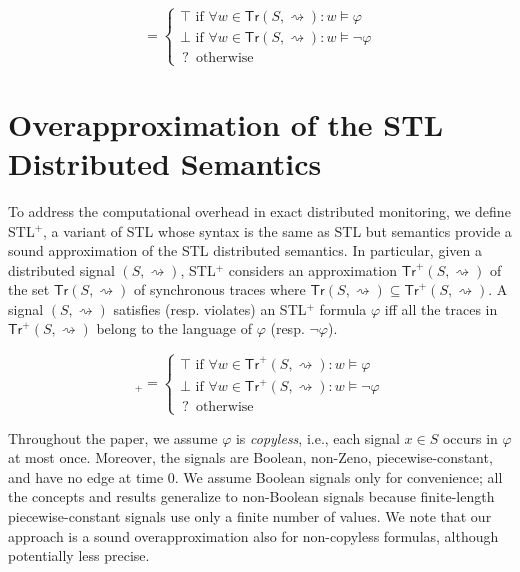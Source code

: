 \documentclass[iicol,lineno]{sn-jnl}
\newcommand{\hb}{\rightsquigarrow}
\newcommand{\tr}{\mathsf{Tr}}
\newcommand{\?}{\text{?}}
\begin{document}
	\begin{equation*}
		[(S,{\hb}) \models \varphi] = 
		\begin{cases}
			\top \text{ if } \forall w \in \tr(S,{\hb}) : w \models \varphi \\
			\bot \text{ if } \forall w \in \tr(S,{\hb}) : w \models \lnot\varphi \\
			\,?\, \text{ otherwise}
		\end{cases}
	\end{equation*}
	
	
	
	\section{Overapproximation of the STL Distributed Semantics}
	\label{sec:semantics}
	
	To address the computational overhead in exact distributed monitoring, we define STL$^+$, a variant of STL whose syntax is the same as STL but semantics provide a sound approximation of the STL distributed semantics.
	In particular, given a distributed signal $(S,{\hb})$, STL$^+$ considers an approximation 
	$\tr^+(S,{\hb})$ of the set $\tr(S,{\hb})$ of synchronous traces where $ \tr(S,{\hb}) \subseteq \tr^+(S,{\hb})$.
	A signal $(S,{\hb})$ satisfies (resp. violates) an STL$^+$ formula $\varphi$ iff all the traces in $\tr^+(S,{\hb})$ belong to the language of $\varphi$ (resp. $\lnot \varphi$).
	
	\begin{equation*}
		[(S,{\hb}) \models \varphi]_+ = 
		\begin{cases}
			\top \text{ if } \forall w \in \tr^+(S,{\hb}) : w \models \varphi \\
			\bot \text{ if } \forall w \in \tr^+(S,{\hb}) : w \models \lnot\varphi \\
			\,?\, \text{ otherwise}
		\end{cases}
	\end{equation*}
	
	Throughout the paper, we assume  $\varphi$ is \emph{copyless}, i.e., each signal $x \in S$ occurs in $\varphi$ at most once.
	Moreover, the signals are Boolean, non-Zeno, piecewise-constant, and have no edge at time 0.
	We assume Boolean signals only for convenience; all the concepts and results generalize to non-Boolean signals because finite-length piecewise-constant signals use only a finite number of values.
	We note that our approach is a sound overapproximation also for non-copyless formulas, although potentially less precise.
	
\end{document}
